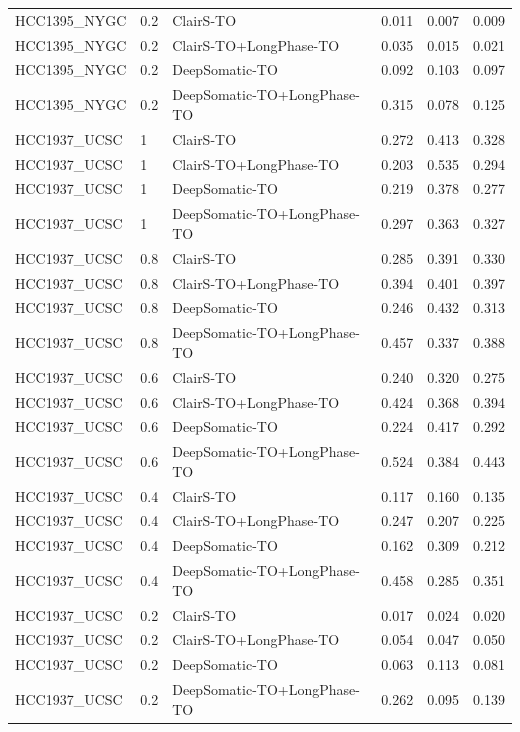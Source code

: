 \documentclass[pdflatex,sn-nature]{sn-jnl}
\begin{document}
{\begin{longtable}{@{}lllccc@{}}
  HCC1395\_NYGC & 0.2 & ClairS-TO & 0.011 & 0.007 & 0.009 \\
  HCC1395\_NYGC & 0.2 & ClairS-TO+LongPhase-TO & 0.035 & 0.015 & 0.021 \\
  HCC1395\_NYGC & 0.2 & DeepSomatic-TO & 0.092 & 0.103 & 0.097 \\
  HCC1395\_NYGC & 0.2 & DeepSomatic-TO+LongPhase-TO & 0.315 & 0.078 & 0.125 \\
  HCC1937\_UCSC & 1 & ClairS-TO & 0.272 & 0.413 & 0.328 \\
  HCC1937\_UCSC & 1 & ClairS-TO+LongPhase-TO & 0.203 & 0.535 & 0.294 \\
  HCC1937\_UCSC & 1 & DeepSomatic-TO & 0.219 & 0.378 & 0.277 \\
  HCC1937\_UCSC & 1 & DeepSomatic-TO+LongPhase-TO & 0.297 & 0.363 & 0.327 \\
  HCC1937\_UCSC & 0.8 & ClairS-TO & 0.285 & 0.391 & 0.330 \\
  HCC1937\_UCSC & 0.8 & ClairS-TO+LongPhase-TO & 0.394 & 0.401 & 0.397 \\
  HCC1937\_UCSC & 0.8 & DeepSomatic-TO & 0.246 & 0.432 & 0.313 \\
  HCC1937\_UCSC & 0.8 & DeepSomatic-TO+LongPhase-TO & 0.457 & 0.337 & 0.388 \\
  HCC1937\_UCSC & 0.6 & ClairS-TO & 0.240 & 0.320 & 0.275 \\
  HCC1937\_UCSC & 0.6 & ClairS-TO+LongPhase-TO & 0.424 & 0.368 & 0.394 \\
  HCC1937\_UCSC & 0.6 & DeepSomatic-TO & 0.224 & 0.417 & 0.292 \\
  HCC1937\_UCSC & 0.6 & DeepSomatic-TO+LongPhase-TO & 0.524 & 0.384 & 0.443 \\
  HCC1937\_UCSC & 0.4 & ClairS-TO & 0.117 & 0.160 & 0.135 \\
  HCC1937\_UCSC & 0.4 & ClairS-TO+LongPhase-TO & 0.247 & 0.207 & 0.225 \\
  HCC1937\_UCSC & 0.4 & DeepSomatic-TO & 0.162 & 0.309 & 0.212 \\
  HCC1937\_UCSC & 0.4 & DeepSomatic-TO+LongPhase-TO & 0.458 & 0.285 & 0.351 \\
  HCC1937\_UCSC & 0.2 & ClairS-TO & 0.017 & 0.024 & 0.020 \\
  HCC1937\_UCSC & 0.2 & ClairS-TO+LongPhase-TO & 0.054 & 0.047 & 0.050 \\
  HCC1937\_UCSC & 0.2 & DeepSomatic-TO & 0.063 & 0.113 & 0.081 \\
  HCC1937\_UCSC & 0.2 & DeepSomatic-TO+LongPhase-TO & 0.262 & 0.095 & 0.139 \\

\end{longtable}}
\end{document}
